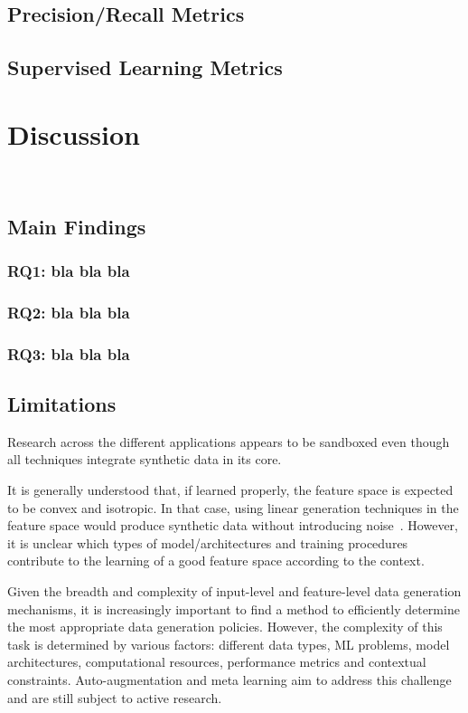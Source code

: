 \documentclass[parskip=full]{scrartcl}
\begin{document}
\subsection{Precision/Recall Metrics}

\subsection{Supervised Learning Metrics}

\section{Discussion}~\label{sec:discussion}

\subsection{Main Findings}


\subsubsection{RQ1: bla bla bla}

\subsubsection{RQ2: bla bla bla}

\subsubsection{RQ3: bla bla bla}

\subsection{Limitations}

Research across the different applications appears to be sandboxed even though
all techniques integrate synthetic data in its core.

It is generally understood that, if learned properly, the feature space is
expected to be convex and isotropic. In that case, using linear generation
techniques in the feature space would produce synthetic data without
introducing noise~\cite{cheung2020modals}. However, it is unclear which types
of model/architectures and training procedures contribute to the learning of a
good feature space according to the context.

Given the breadth and complexity of input-level and feature-level data
generation mechanisms, it is increasingly important to find a method to
efficiently determine the most appropriate data generation policies. However,
the complexity of this task is determined by various factors: different data
types, ML problems, model architectures, computational resources, performance
metrics and contextual constraints. Auto-augmentation and meta learning aim to
address this challenge and are still subject to active research.
\end{document}

